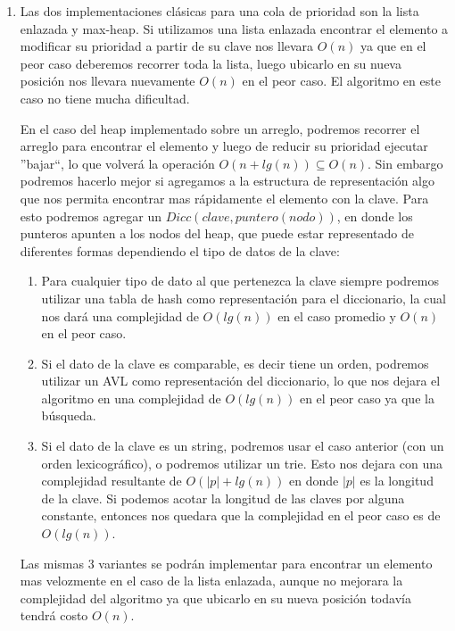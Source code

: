 \documentclass[10pt, a4paper]{article}
\begin{document}
\begin{enumerate}
 \item  Las dos implementaciones cl\'asicas para una cola de prioridad son la lista enlazada y max-heap. Si utilizamos una lista enlazada encontrar el elemento a modificar su prioridad a partir de su clave nos llevara $O(n)$ ya que en el peor caso deberemos recorrer toda la lista, luego ubicarlo en su nueva posici\'on nos llevara nuevamente $O(n)$ en el peor caso. El algoritmo en este caso no tiene mucha dificultad.
 
 En el caso del heap implementado sobre un arreglo, podremos recorrer el arreglo para encontrar el elemento y luego de reducir su prioridad ejecutar ''bajar``, lo que volver\'a la operaci\'on $O(n+lg(n))\subseteq O(n)$. Sin embargo podremos hacerlo mejor si agregamos a la estructura de representaci\'on algo que nos permita encontrar mas r\'apidamente el elemento con la clave. Para esto podremos agregar un $Dicc(clave, puntero(nodo))$, en donde los punteros apunten a los nodos del heap, que puede estar representado de diferentes formas dependiendo el tipo de datos de la clave:
 
 \begin{enumerate}
  \item Para cualquier tipo de dato al que pertenezca la clave siempre podremos utilizar una tabla de hash como representaci\'on para el diccionario, la cual nos dar\'a una complejidad de $O(lg(n))$ en el caso promedio y $O(n)$ en el peor caso.
  \item Si el dato de la clave es comparable, es decir tiene un orden, podremos utilizar un AVL como representaci\'on del diccionario, lo que nos dejara el algoritmo en una complejidad de $O(lg(n))$ en el peor caso ya que la b\'usqueda.
  \item Si el dato de la clave es un string, podremos usar el caso anterior (con un orden lexicogr\'afico), o podremos utilizar un trie. Esto nos dejara con una complejidad resultante de $O(|p|+lg(n))$ en donde $|p|$ es la longitud de la clave. Si podemos acotar la longitud de las claves por alguna constante, entonces nos quedara que la complejidad en el peor caso es de $O(lg(n))$.
 \end{enumerate}
 
 Las mismas 3 variantes se podr\'an implementar para encontrar un elemento mas velozmente en el caso de la lista enlazada, aunque no mejorara la complejidad del algoritmo ya que ubicarlo en su nueva posici\'on todav\'ia tendr\'a costo $O(n)$.


\end{enumerate}
\end{document}
